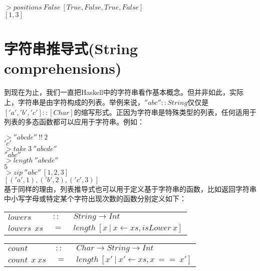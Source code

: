 \noindent\hspace*{1cm}$>positions~False~[True,False,True,False]$\\
\hspace*{1cm}$[1,3]$

\section{字符串推导式(String comprehensions)}
到现在为止，我们一直把Haskell中的字符串看作基本概念。但并非如此，实际上，字符串是由字符构成的列表。举例来说，$''abc''::String$仅仅是$['a','b','c']::[Char]$的缩写形式。正因为字符串是特殊类型的列表，任何适用于列表的多态函数都可以应用于字符串。例如：

\noindent\hspace*{1cm}$>''abcde''~!!~2$\\
\hspace*{1cm}$'c'$\\

\noindent\hspace*{1cm}$>take~3~''abcde''$\\
\hspace*{1cm}$''abc''$\\

\noindent\hspace*{1cm}$>length~''abcde''$\\
\hspace*{1cm}$5$\\

\noindent\hspace*{1cm}$>zip~''abc''~[1,2,3]$\\
\hspace*{1cm}$[('a',1),('b',2),('c',3)]$\\

基于同样的理由，列表推导式也可以用于定义基于字符串的函数，比如返回字符串中小写字母或特定某个字符出现次数的函数分别定义如下：

\begin{tabular}[t]{lll}
  $lowers$&$~::~$&$String \rightarrow Int$\\
  $lowers~~xs$&$~=~$&$length~[x~|~x \leftarrow xs, isLower~x]$\\
\end{tabular}


\begin{tabular}[t]{lll}
  $count$&$~::~$&$Char\rightarrow String \rightarrow Int$\\
  $count~~x~xs$&$~=~$&$length~[x'~|~x' \leftarrow xs, x~==~x']$\\
\end{tabular}


